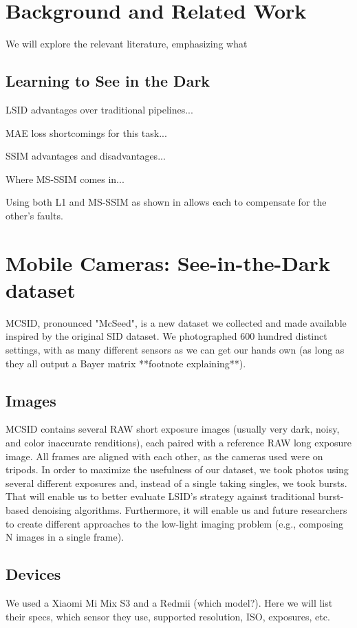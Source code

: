 \chapter{Background and Related Work}
We will explore the relevant literature, emphasizing what 

\section{Learning to See in the Dark}
LSID advantages over traditional pipelines...

MAE loss shortcomings for this task...

SSIM advantages and disadvantages...

Where MS-SSIM comes in...

Using both L1 and MS-SSIM as shown in \cite{DBLP:journals/tci/ZhaoGFK17:l1ssimloss} allows each to compensate for the other's faults.


\chapter{Mobile Cameras: See-in-the-Dark dataset}
MCSID, pronounced "McSeed", is a new dataset we collected and made available inspired by the original SID dataset.
We photographed 600 hundred distinct settings, with as many different sensors as we can get our hands own (as long as they all output a Bayer matrix **footnote explaining**).

\section{Images}
MCSID contains several RAW short exposure images (usually very dark, noisy, and color inaccurate renditions), each paired with a reference RAW long exposure image.
All frames are aligned with each other, as the cameras used were on tripods.
In order to maximize the usefulness of our dataset, we took photos using several different exposures and, instead of a single taking singles, we took bursts.
That will enable us to better evaluate LSID's strategy against traditional burst-based denoising algorithms.
Furthermore, it will enable us and future researchers to create different approaches to the low-light imaging problem (e.g., composing N images in a single frame).

\section{Devices}
We used a Xiaomi Mi Mix S3 and a Redmii (which model?).
Here we will list their specs, which sensor they use, supported resolution, ISO, exposures, etc.


